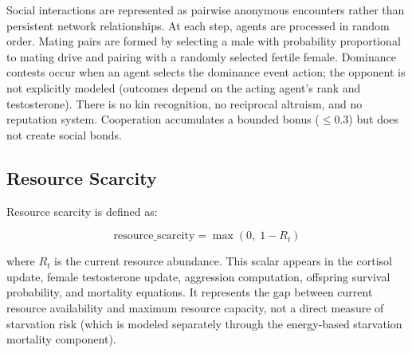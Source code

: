 Social interactions are represented as pairwise anonymous encounters rather than persistent network relationships. At each step, agents are processed in random order. Mating pairs are formed by selecting a male with probability proportional to mating drive and pairing with a randomly selected fertile female. Dominance contests occur when an agent selects the dominance event action; the opponent is not explicitly modeled (outcomes depend on the acting agent's rank and testosterone). There is no kin recognition, no reciprocal altruism, and no reputation system. Cooperation accumulates a bounded bonus ($\leq 0.3$) but does not create social bonds.

\subsection{Resource Scarcity}
\label{sec:resource_scarcity}

Resource scarcity is defined as:

\begin{equation}
\text{resource\_scarcity} = \max(0,\; 1 - R_t)
\label{eq:resource_scarcity}
\end{equation}

where $R_t$ is the current resource abundance. This scalar appears in the cortisol update, female testosterone update, aggression computation, offspring survival probability, and mortality equations. It represents the gap between current resource availability and maximum resource capacity, not a direct measure of starvation risk (which is modeled separately through the energy-based starvation mortality component).
